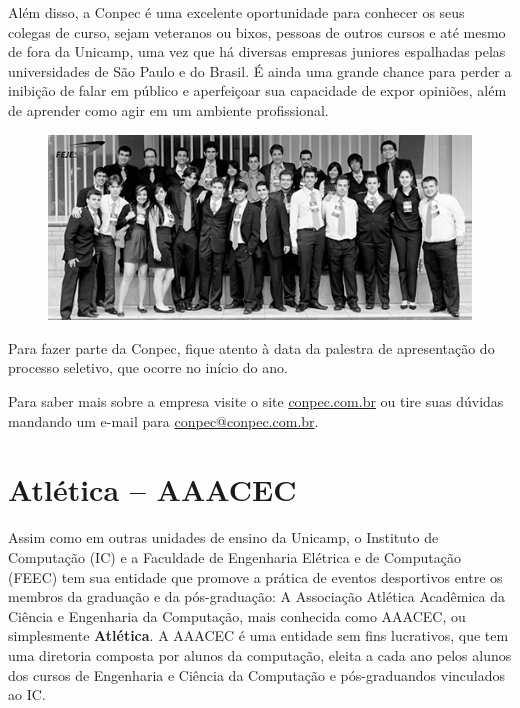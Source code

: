 Além disso, a Conpec é uma excelente oportunidade para conhecer os seus colegas
de curso, sejam veteranos ou bixos, pessoas de outros cursos e até mesmo de fora da
Unicamp, uma vez que há diversas empresas juniores espalhadas pelas universidades de São Paulo e do Brasil. É ainda uma grande chance para perder a inibição de falar em
público e aperfeiçoar sua capacidade de expor opiniões, além de aprender como
agir em um ambiente profissional.

\begin{figure}[H]
    \centering
    \includegraphics[scale=0.40]{img/conpec_foto.jpg}
\end{figure}

Para fazer parte da Conpec, fique atento à data da palestra de apresentação do
processo seletivo, que ocorre no início do ano.

Para saber mais sobre a empresa visite o site \url{conpec.com.br} ou
tire suas dúvidas mandando um e-mail para \url{conpec@conpec.com.br}.

\newpage
\section{Atlética -- AAACEC}

Assim como em outras unidades de ensino da Unicamp, o Instituto de Computação
(IC) e a Faculdade de Engenharia Elétrica e de Computação (FEEC) tem sua
entidade que promove a prática de eventos desportivos entre os membros da
graduação e da pós-graduação: A Associação Atlética Acadêmica da Ciência
e Engenharia da Computação, mais conhecida como AAACEC, ou simplesmente
\textbf{Atlética}. A AAACEC é uma entidade sem fins lucrativos, que tem uma
diretoria composta por alunos da computação, eleita a cada ano pelos alunos
dos cursos de Engenharia e Ciência da Computação e pós-graduandos vinculados ao IC.

